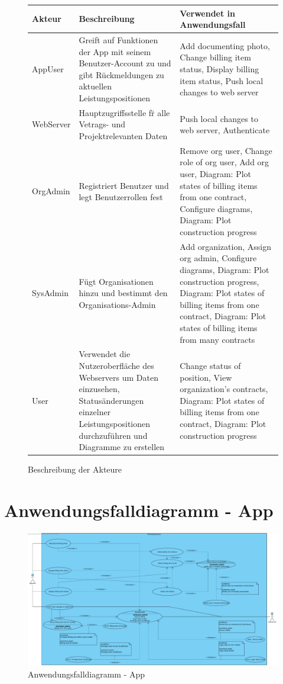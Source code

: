 \begin{figure}[h]
	\centering
	\begin{tabularx}{\textwidth}{ p{} | X | X }
		\textbf{Akteur} & \textbf{Beschreibung} & \textbf{Verwendet in Anwendungsfall} \\ \hline
		AppUser & Greift auf Funktionen der App mit seinem Benutzer-Account zu und gibt R\"uckmeldungen zu aktuellen Leistungspositionen &  Add documenting photo,  Change billing item status,  Display billing item status, Push local changes to web server  \\ \hline
		WebServer & Hauptzugriffsstelle f\"r alle Vetrags- und Projektrelevanten Daten &  Push local changes to web server,  Authenticate\\ \hline
		OrgAdmin & Registriert Benutzer und legt Benutzerrollen fest & Remove org user,  Change role of org user,  Add org user, Diagram: Plot states of billing items from one contract,  Configure diagrams,  Diagram: Plot construction progress\\ \hline
		SysAdmin & F\"ugt Organisationen hinzu und bestimmt den Organisations-Admin & Add organization, Assign org admin,  Configure diagrams, Diagram: Plot construction progress,  Diagram: Plot states of billing items from one contract,  Diagram: Plot states of billing items from many contracts \\ \hline
		User & Verwendet die Nutzeroberfl\"ache des Webservers um Daten einzusehen,  Status\"anderungen einzelner Leistungspositionen durchzuf\"uhren und Diagramme zu erstellen & Change status of position,  View organization's contracts, Diagram: Plot states of billing items from one contract,  Diagram: Plot construction progress 
	\end{tabularx}
	
	\caption{Beschreibung der Akteure}
	\label{fig:akteur-tabelle}
\end{figure}

\newpage

\section{Anwendungsfalldiagramm - App}

\begin{figure}[h]
	\centering
    \includegraphics[width=\linewidth]{img/diagrams/Mobile_Application.pdf}
	\caption{Anwendungsfalldiagramm - App}
	\label{fig:anwendungsfalldiagramm-app}
\end{figure}

